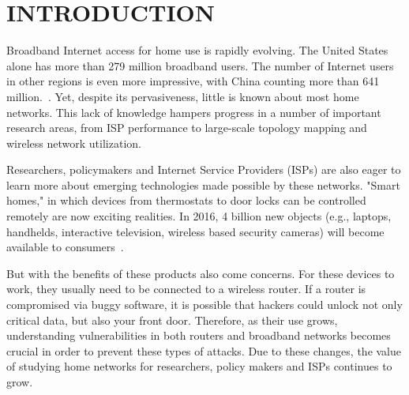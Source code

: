 \chapter{INTRODUCTION}
\label{sec.introduction}
Broadband Internet access for home use is rapidly evolving. The United States
alone has
more than 279 million broadband users. The number of Internet users in other regions is even more
impressive, with China counting more than 641 million.~\cite{asia}. Yet, despite its
pervasiveness, little is known about most home networks. This lack of knowledge hampers progress in
a number of important research areas, from ISP performance to large-scale
topology mapping and wireless network utilization.

Researchers, policymakers and Internet Service Providers (ISPs) are also eager to
learn more about emerging technologies made possible by these networks.
"Smart homes," in which devices from thermostats to door locks can be controlled
remotely  are now exciting realities. In 2016, 4 billion
new objects (e.g., laptops, handhelds, interactive television, wireless
based security cameras) will become available to consumers~\cite{gartner}.

But with the benefits of these products also come concerns. For these devices to
 work, they usually need to be connected to a wireless router. If a router
 is compromised via buggy software, it is possible that hackers could unlock
 not only critical data, but also
  your front door. Therefore, as their use grows, understanding vulnerabilities in both routers and
broadband networks becomes crucial in order to prevent these types of attacks.
Due to these changes, the value of studying home networks for researchers, policy
 makers and ISPs continues to grow.

